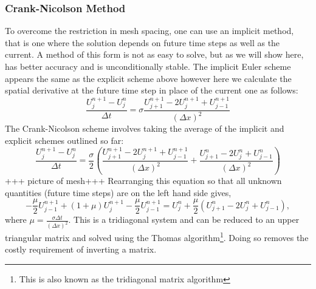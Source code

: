 \documentclass[11pt, a4paper, draft]{article}
\newcommand{\Dt}{\Delta t}
\newcommand{\Dx}{\Delta x}
\begin{document}
        \subsubsection*{Crank-Nicolson Method}
        To overcome the restriction in mesh spacing, one can use an implicit method, that is one where the solution depends on future time steps as well as the current. A method of this form is not as easy to solve, but as we will show here, has better accuracy and is unconditionally stable. The implicit Euler scheme appears the same as the explicit scheme above however here we calculate the spatial derivative at the future time step in place of the current one as follows:
        \[
          \frac{U^{n+1}_{j}  - U^{n}_{j}}{\Dt} = \sigma \frac{U^{n+1}_{j+1}-2U^{n+1}_{j}+U^{n+1}_{j-1}}{(\Dx)^2}
        \]
        The Crank-Nicolson scheme involves taking the average of the implicit and explicit schemes outlined so far:
        \[
             \frac{U^{n+1}_{j}-U^{n}_{j}}{\Dt} = \frac{\sigma}{2}\left(\frac{U^{n+1}_{j+1}-2U^{n+1}_{j}+U^{n+1}_{j-1}}{(\Dx)^2}+\frac{U^{n}_{j+1}-2U^{n}_{j}+U^{n}_{j-1}}{(\Dx)^2}\right)
        \]
        +++ picture of mesh+++
        Rearranging this equation so that all unknown quantities (future time steps) are on the left hand side gives,
            \[
                -\frac{\mu}{2} U^{n+1}_{j-1} + (1+\mu)U^{n+1}_{j} - \frac{\mu}{2} U^{n+1}_{j-1} = U^{n}_{j} + \frac{\mu}{2} \left( U^{n}_{j+1} - 2U^{n}_{j}+U^{n}_{j-1}\right),
            \]
        where $\mu = \frac{\sigma \Dt}{(\Dx)^2 }$. This is a tridiagonal system and can be reduced to an upper triangular matrix and solved using the Thomas algorithm\footnote{This is also known as the tridiagonal matrix algorithm}. Doing so removes the costly requirement of inverting a matrix.
\end{document}
